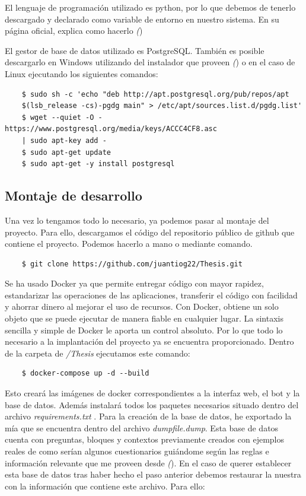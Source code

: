 El lenguaje de programación utilizado es python, por lo que debemos de tenerlo descargado y declarado como variable de entorno en nuestro sistema. En su página oficial, explica como hacerlo \textit({\cite{python})}

El gestor de base de datos utilizado es PostgreSQL. También es posible descargarlo en Windows utilizando del instalador que proveen \textit({\cite{postgres})} o en el caso de Linux ejecutando los siguientes comandos:

\begin{verbatim}
    $ sudo sh -c 'echo "deb http://apt.postgresql.org/pub/repos/apt
    $(lsb_release -cs)-pgdg main" > /etc/apt/sources.list.d/pgdg.list'
    $ wget --quiet -O - https://www.postgresql.org/media/keys/ACCC4CF8.asc 
    | sudo apt-key add -
    $ sudo apt-get update
    $ sudo apt-get -y install postgresql
\end{verbatim}


\subsection{Montaje de desarrollo}

Una vez lo tengamos todo lo necesario, ya podemos pasar al montaje del proyecto. Para ello, descargamos el código del repositorio público de github que contiene el proyecto. Podemos hacerlo a mano o mediante comando.

\begin{verbatim}
    $ git clone https://github.com/juantiog22/Thesis.git
\end{verbatim}

Se ha usado Docker ya que permite entregar código con mayor rapidez, estandarizar las operaciones de las aplicaciones, transferir el código con facilidad y ahorrar dinero al mejorar el uso de recursos. Con Docker, obtiene un solo objeto que se puede ejecutar de manera fiable en cualquier lugar. La sintaxis sencilla y simple de Docker le aporta un control absoluto. Por lo que todo lo necesario a la implantación del proyecto ya se encuentra proporcionado. Dentro de la carpeta de \textit{/Thesis} ejecutamos este comando:

\begin{verbatim}
    $ docker-compose up -d --build  
\end{verbatim}

Esto creará las imágenes de docker correspondientes a la interfaz web, el bot y la base de datos. Además instalará todos los paquetes necesarios situado dentro del archivo \textit{requirements.txt} . 
Para la creación de la base de datos, he exportado la mía que se encuentra dentro del archivo \textit{dumpfile.dump}. Esta base de datos cuenta con preguntas, bloques y contextos previamente creados con ejemplos reales de como serían algunos cuestionarios guiándome según las reglas e información relevante que me proveen desde \textit({\cite{postcovid})}. En el caso de querer establecer esta base de datos tras haber hecho el paso anterior debemos restaurar la nuestra con la información que contiene este archivo. Para ello:

